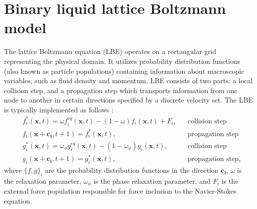 \documentclass[preprint,12pt]{elsarticle}
\begin{document}
\section{Binary liquid lattice Boltzmann model}
The lattice Boltzmann equation (LBE) operates on a rectangular grid representing the
physical domain. It utilizes
probability distribution functions (also known as particle populations)
containing information about
macroscopic variables, such as fluid density and momentum. LBE consists of
two parts: a local collision step, and a propagation step which transports
information from one node to another in certain
directions specified by a discrete velocity set.
The LBE is typically implemented as follows \cite{ginzburg-boundary-main}:
\begin{equation}
\label{standard:implementation}
\begin{aligned}
&f_i^{*}(\bm{x},t)=\omega f_i^{eq}(\bm{x},t)-(1-\omega) f_i(\bm{x},t) +
F_i,&&\text{collision step}\\
&f_i(\bm{x}+\bm{c_i},t+1)=f_i^{*}(\bm{x},t),&&\text{propagation step}\\
&g_i^{*}(\bm{x},t)=\omega_{\phi} g_i^{eq}(\bm{x},t)-(1-\omega_{\phi})
g_i(\bm{x},t),&&\text{collision step}\\
&g_i(\bm{x}+\bm{c_i},t+1)=g_i^{*}(\bm{x},t),&&\text{propagation step},
\end{aligned}
\end{equation}
where $\{f,g\}_i$ are the probability distribution functions in the direction $\bm{c_i}$, $\omega$
is the
relaxation parameter, $\omega_{\phi}$ is the phase relaxation parameter, and $F_i$ is the external
force population responsible for force inclusion to the Navier-Stokes equation.
\end{document}
